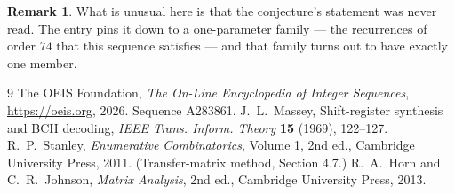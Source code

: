 \documentclass[11pt,a4paper]{article}
\theoremstyle{plain}
\theoremstyle{definition}
\newtheorem{remark}[theorem]{Remark}
\begin{document}
\begin{remark}
What is unusual here is that the conjecture's statement was never read. The entry pins it down
to a one-parameter family --- the recurrences of order $74$ that this sequence satisfies
--- and that family turns out to have exactly one member.
\end{remark}

\begin{thebibliography}{9}
 The OEIS Foundation, \emph{The On-Line Encyclopedia of Integer
Sequences}, \url{https://oeis.org}, 2026. Sequence A283861.
 J.~L.~Massey, Shift-register synthesis and BCH decoding, \emph{IEEE
Trans. Inform. Theory} \textbf{15} (1969), 122--127.
 R.~P.~Stanley, \emph{Enumerative Combinatorics}, Volume 1, 2nd ed.,
Cambridge University Press, 2011. (Transfer-matrix method, Section 4.7.)
 R.~A.~Horn and C.~R.~Johnson, \emph{Matrix Analysis}, 2nd ed., Cambridge
University Press, 2013.
\end{thebibliography}
\end{document}
